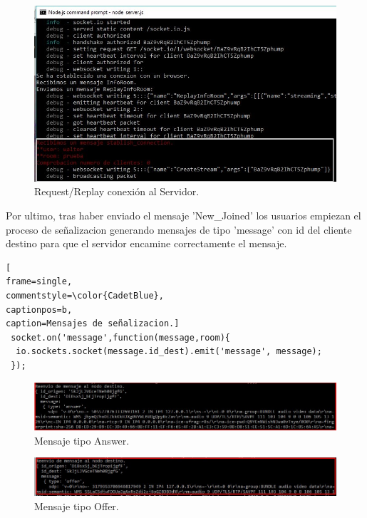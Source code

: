 \begin{figure}[!h]
\begin{center}
   \includegraphics[width=0.6\linewidth]{Figures/StablishConnectionServer}
	\decoRule
	\caption[Request/Replay conexión Servidor]{Request/Replay conexión al Servidor.}
\label{fig:EjecucionStablishConnection}
\end{center}
\end{figure}
Por ultimo, tras haber enviado el mensaje 'New\_Joined' los usuarios empiezan el proceso de señalizacion generando mensajes de tipo 'message' con id del cliente destino para que el servidor encamine correctamente el mensaje.
\begin{lstlisting}[
frame=single,
commentstyle=\color{CadetBlue},
captionpos=b,
caption=Mensajes de señalizacion.]
 socket.on('message',function(message,room){
  io.sockets.socket(message.id_dest).emit('message', message);
 });
\end{lstlisting}
\begin{figure}[!h]
\begin{center}
   \includegraphics[width=0.8\linewidth]{Figures/AnswerServer}
	\decoRule
	\caption[Request/Replay conexión Servidor]{Mensaje tipo Answer.}
\label{fig:EjecucionStablishConnection}
\end{center}
\end{figure}
\begin{figure}[!h]
\begin{center}
   \includegraphics[width=0.8\linewidth]{Figures/OfferServer}
	\decoRule
	\caption[Request/Replay conexión Servidor]{Mensaje tipo Offer.}
\label{fig:EjecucionStablishConnection}
\end{center}
\end{figure}
